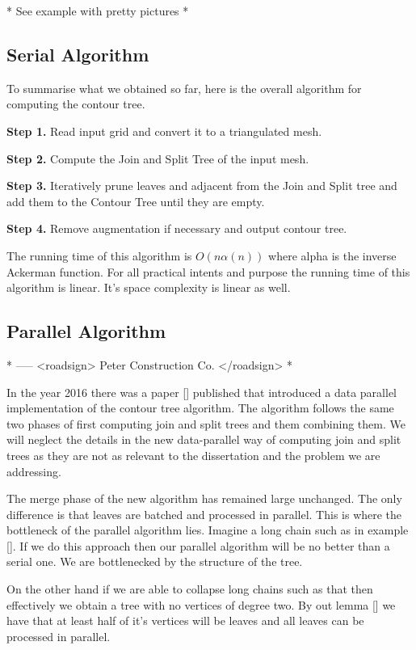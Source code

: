* See example with pretty pictures *

\subsection{Serial Algorithm}

To summarise what we obtained so far, here is the overall algorithm for computing the contour tree.

\textbf{Step 1.} Read input grid and convert it to a triangulated mesh.

\textbf{Step 2.} Compute the Join and Split Tree of the input mesh.

\textbf{Step 3.} Iteratively prune leaves and adjacent from the Join and Split tree and add them to the Contour Tree until they are empty.

\textbf{Step 4.} Remove augmentation if necessary and output contour tree.

The running time of this algorithm is $O(n\alpha(n))$ where alpha is the inverse Ackerman function. For all practical intents and purpose the running time of this algorithm is linear. It's space complexity is linear as well.

\subsection{Parallel Algorithm}

* ----- <roadsign> Peter Construction Co. </roadsign> *


In the year 2016 there was a paper [] published that introduced a data parallel implementation of the contour tree algorithm. The algorithm follows the same two phases of first computing join and split trees and them combining them. We will neglect the details in the new data-parallel way of computing join and split trees as they are not as relevant to the dissertation and the problem we are addressing.  


The merge phase of the new algorithm has remained large unchanged. The only difference is that leaves are batched and processed in parallel. This is where the bottleneck of the parallel algorithm lies. Imagine a long chain such as in example []. If we do this approach then our parallel algorithm will be no better than a serial one. We are bottlenecked by the structure of the tree. 

On the other hand if we are able to collapse long chains such as that then effectively we obtain a tree with no vertices of degree two. By out lemma [] we have that at least half of it's vertices will be leaves and all leaves can be processed in parallel.

